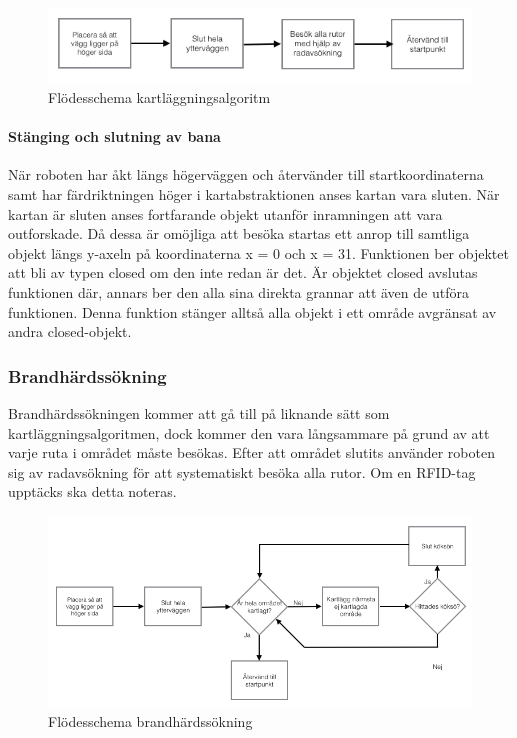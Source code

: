 \documentclass[a4paper,12pt,fleqn]{article}
\begin{document}
\begin{figure}[htp] %
  \begin{center}
  \includegraphics[keepaspectratio=true,width=0.8\linewidth]{bilder/flode_brandhard.jpg}  %
  \end{center}
  \caption{Flödesschema kartläggningsalgoritm} %
  \label{fig:map} %
\end{figure}

\paragraph{Stänging och slutning av bana}
När roboten har åkt längs högerväggen och återvänder till startkoordinaterna samt har färdriktningen höger i kartabstraktionen anses kartan vara sluten. När kartan är sluten anses fortfarande objekt utanför inramningen att vara outforskade. Då dessa är omöjliga att besöka startas ett anrop till samtliga objekt längs y-axeln på koordinaterna x = 0 och x = 31. Funktionen ber objektet att bli av typen closed om den inte redan är det. Är objektet closed avslutas funktionen där, annars ber den alla sina direkta grannar att även de utföra funktionen. Denna funktion stänger alltså alla objekt i ett område avgränsat av andra closed-objekt.

\newpage

\subsubsection{Brandhärdssökning}

Brandhärdssökningen kommer att gå till på liknande sätt som kartläggningsalgoritmen, dock kommer den vara långsammare på grund av att varje ruta i området måste besökas. Efter att området slutits använder roboten sig av radavsökning för att systematiskt besöka alla rutor. Om en RFID-tag upptäcks ska detta noteras.

\begin{figure}[htp] %
  \begin{center}
  \includegraphics[keepaspectratio=true,width=0.5\linewidth]{bilder/Flode_kartritning.jpg}  %
  \end{center}
  \caption{Flödesschema brandhärdssökning} %
  \label{fig:fire} %
\end{figure}
\end{document}
